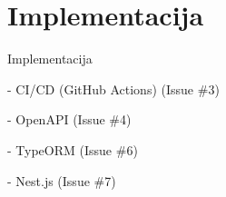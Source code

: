 \chapter{Implementacija}\label{ch:impl}

Implementacija

- CI/CD (GitHub Actions) (Issue \#3)

- OpenAPI (Issue \#4)

- TypeORM (Issue \#6)

- Nest.js (Issue \#7)
